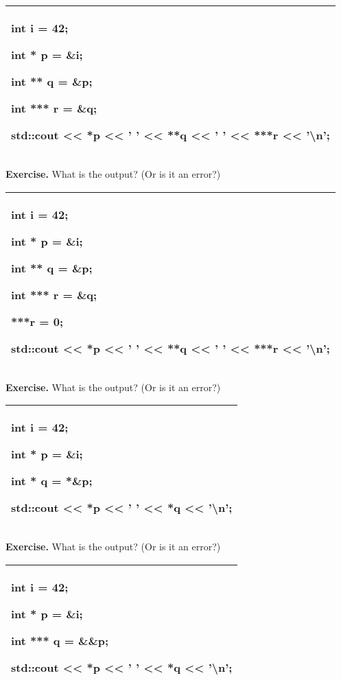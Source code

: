 \documentclass[
]{article}
\begin{document}
\begin{longtable}[]{@{}l@{}}
\toprule
\endhead
\begin{minipage}[t]{0.97\columnwidth}\raggedright
int i = 42;

int * p = \&i;

int ** q = \&p;

int *** r = \&q;

std::cout \textless\textless{} *p \textless\textless{} ' '
\textless\textless{} **q \textless\textless{} ' ' \textless\textless{}
***r \textless\textless{} '\textbackslash n'; \strut
\end{minipage}\tabularnewline
\bottomrule
\end{longtable}

\textbf{Exercise.} What is the output? (Or is it an error?)

\begin{longtable}[]{@{}l@{}}
\toprule
\endhead
\begin{minipage}[t]{0.97\columnwidth}\raggedright
int i = 42;

int * p = \&i;

int ** q = \&p;

int *** r = \&q;

***r = 0;

std::cout \textless\textless{} *p \textless\textless{} ' '
\textless\textless{} **q \textless\textless{} ' ' \textless\textless{}
***r \textless\textless{} '\textbackslash n'; \strut
\end{minipage}\tabularnewline
\bottomrule
\end{longtable}

\textbf{Exercise.} What is the output? (Or is it an error?)

\begin{longtable}[]{@{}l@{}}
\toprule
\endhead
\begin{minipage}[t]{0.97\columnwidth}\raggedright
int i = 42;

int * p = \&i;

int * q = *\&p;

std::cout \textless\textless{} *p \textless\textless{} ' '
\textless\textless{} *q \textless\textless{} '\textbackslash n'; \strut
\end{minipage}\tabularnewline
\bottomrule
\end{longtable}

\textbf{Exercise.} What is the output? (Or is it an error?)

\begin{longtable}[]{@{}l@{}}
\toprule
\endhead
\begin{minipage}[t]{0.97\columnwidth}\raggedright
int i = 42;

int * p = \&i;

int *** q = \&\&p;

std::cout \textless\textless{} *p \textless\textless{} ' '
\textless\textless{} *q \textless\textless{} '\textbackslash n'; \strut
\end{minipage}\tabularnewline
\bottomrule
\end{longtable}
\end{document}
